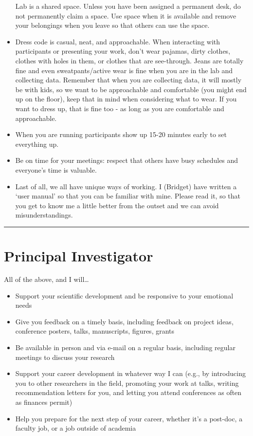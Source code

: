 \documentclass[]{book}
\providecommand{\tightlist}{%
  \setlength{\itemsep}{0pt}\setlength{\parskip}{0pt}}
\begin{document}
\begin{itemize}
  Lab is a shared space. Unless you have been assigned a permanent desk, do not permanently claim a space. Use space when it is available and remove your belongings when you leave so that others can use the space.
\item
  Dress code is casual, neat, and approachable. When interacting with participants or presenting your work, don't wear pajamas, dirty clothes, clothes with holes in them, or clothes that are see-through. Jeans are totally fine and even sweatpants/active wear is fine when you are in the lab and collecting data. Remember that when you are collecting data, it will mostly be with kids, so we want to be approachable and comfortable (you might end up on the floor), keep that in mind when considering what to wear. If you want to dress up, that is fine too - as long as you are comfortable and approachable.
\item
  When you are running participants show up 15-20 minutes early to set everything up.
\item
  Be on time for your meetings: respect that others have busy schedules and everyone's time is valuable.
\item
  Last of all, we all have unique ways of working. I (Bridget) have written a `user manual' so that you can be familiar with mine. Please read it, so that you get to know me a little better from the outset and we can avoid misunderstandings.
\end{itemize}

\begin{center}\rule{0.5\linewidth}{0.5pt}\end{center}

\hypertarget{principal-investigator}{%
\section{Principal Investigator}\label{principal-investigator}}

All of the above, and I will\ldots{}

\begin{itemize}
\tightlist
\item
  Support your scientific development and be responsive to your emotional needs
\item
  Give you feedback on a timely basis, including feedback on project ideas, conference posters, talks, manuscripts, figures, grants
\item
  Be available in person and via e-mail on a regular basis, including regular meetings to discuss your research
\item
  Support your career development in whatever way I can (e.g., by introducing you to other researchers in the field, promoting your work at talks, writing recommendation letters for you, and letting you attend conferences as often as finances permit)
\item
  Help you prepare for the next step of your career, whether it's a post-doc, a faculty job, or a job outside of academia
\end{itemize}
\end{document}
